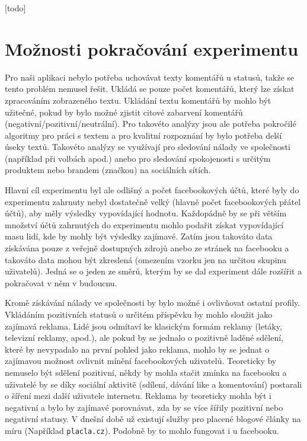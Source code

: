 \documentclass[thesis=M,czech]{FITthesis}[2013/05/10]
\begin{document}
[todo]

\section{Možnosti pokračování experimentu}

Pro naši aplikaci nebylo potřeba uchovávat texty komentářů u statusů, takže se tento problém nemusel řešit. Ukládá se pouze počet komentářů, který lze získat zpracováním zobrazeného textu. Ukládání textu komentářů by mohlo být užitečné, pokud by bylo možné zjistit citové zabarvení komentářů (negativní/pozitivní/neutrální). Pro takovéto analýzy jsou ale potřeba pokročilé algoritmy pro práci s textem a pro kvalitní rozpoznání by bylo potřeba delší úseky textů. Takovéto analýzy se využívají pro sledování nálady ve společnosti (například při volbách apod.) anebo pro sledování spokojenosti s určitým produktem nebo brandem (značkou) na sociálních sítích. 

Hlavní cíl experimentu byl ale odlišný a počet facebookových účtů, které byly do experimentu zahrnuty nebyl dostatečně velký (hlavně počet facebookových přátel účtů), aby měly výsledky vypovídající hodnotu. Každopádně by se při větším množství účtů zahrnutých do experimentu mohlo podařit získat vypovídající masu lidí, kde by mohly být výsledky zajímavé. Zatím jsou takováto data získávána pouze z veřejně dostupných zdrojů anebo ze stránek na facebooku a takováto data mohou být zkreslená (omezením vzorku jen na určitou skupinu uživatelů). Jedná se o jeden ze směrů, kterým by se dal experiment dále rozšířit a pokračovat v něm v budoucnu.

Kromě získávání nálady ve společnosti by bylo možné i ovlivňovat ostatní profily. Vkládáním pozitivních statusů o určitém příspěvku by mohlo sloužit jako zajímavá reklama. Lidé jsou odmítaví ke klasickým formám reklamy (letáky, televizní reklamy, apod.), ale pokud by se jednalo o pozitivně laděné sdělení, které by nevypadalo na první pohled jako reklama, mohlo by se jednat o zajímavou možnost ovlivnit mínění facebookových uživatelů. Teoreticky by nemuselo být sdělení pozitivní, někdy by mohla stačit zmínka na facebooku a uživatelé by se díky sociální aktivitě (sdílení, dávání like a komentování) postarali o šíření mezi další uživatele internetu. Reklama by teoreticky mohla být i negativní a bylo by zajímavé porovnávat, zda by se více šířily pozitivní nebo negativní statusy. V dnešní době už existují služby pro placené blogové články na míru (Například \verb|placla.cz|). Podobně by to mohlo fungovat i u facebooku.
\end{document}
